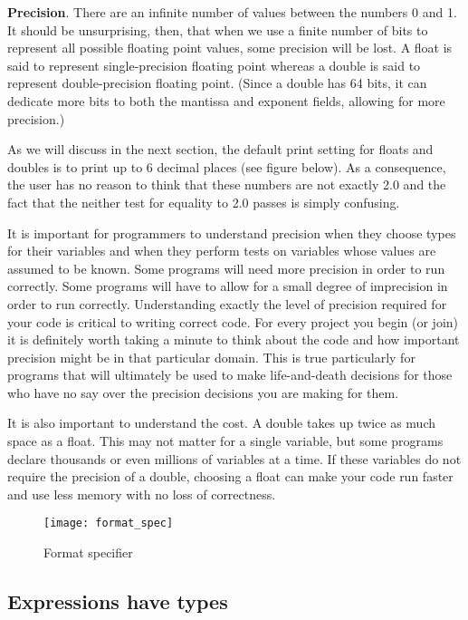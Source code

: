 \documentclass[11pt, a4paper]{article}
\begin{document}
\textbf{Precision}. There are an infinite number of values between the numbers 0 and 1. It should be unsurprising, then, that when we use a finite number of bits to represent all possible floating point values, some precision will be lost. A float is said to represent single-precision floating point whereas a double is said to represent double-precision floating point. (Since a double has 64 bits, it can dedicate more bits to both the mantissa and exponent fields, allowing for more precision.)



As we will discuss in the next section, the default print setting for floats and doubles is to print up to 6 decimal places (see figure below). As a consequence, the user has no reason to think that these numbers are not exactly 2.0 and the fact that the neither test for equality to 2.0 passes is simply confusing.

It is important for programmers to understand precision when they choose types for their variables and when they perform tests on variables whose values are assumed to be known. Some programs will need more precision in order to run correctly. Some programs will have to allow for a small degree of imprecision in order to run correctly. Understanding exactly the level of precision required for your code is critical to writing correct code. For every project you begin (or join) it is definitely worth taking a minute to think about the code and how important precision might be in that particular domain. This is true particularly for programs that will ultimately be used to make life-and-death decisions for those who have no say over the precision decisions you are making for them.

It is also important to understand the cost. A double takes up twice as much space as a float. This may not matter for a single variable, but some programs declare thousands or even millions of variables at a time. If these variables do not require the precision of a double, choosing a float can make your code run faster and use less memory with no loss of correctness.



\begin{figure}[htpb]
  \centering
  \texttt{[image: format\_spec]}
  \caption{Format specifier}
  \label{fig:format_specifier}
\end{figure}


\subsection{Expressions have types}%
\label{sub:expressions_have_types}
\end{document}
